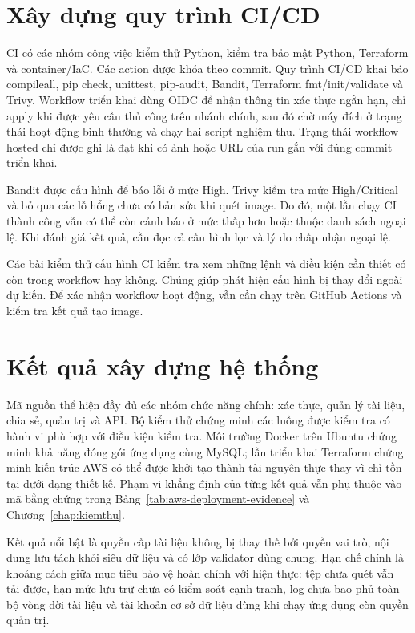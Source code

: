 \section{Xây dựng quy trình CI/CD}
CI có các nhóm công việc kiểm thử Python, kiểm tra bảo mật Python, Terraform và container/IaC. Các action được khóa theo commit. Quy trình CI/CD khai báo compileall, pip check, unittest, pip-audit, Bandit, Terraform fmt/init/validate và Trivy. Workflow triển khai dùng OIDC để nhận thông tin xác thực ngắn hạn, chỉ apply khi được yêu cầu thủ công trên nhánh chính, sau đó chờ máy đích ở trạng thái hoạt động bình thường và chạy hai script nghiệm thu. Trạng thái workflow hosted chỉ được ghi là đạt khi có ảnh hoặc URL của run gắn với đúng commit triển khai.

Bandit được cấu hình để báo lỗi ở mức High. Trivy kiểm tra mức High/Critical và bỏ qua các lỗ hổng chưa có bản sửa khi quét image. Do đó, một lần chạy CI thành công vẫn có thể còn cảnh báo ở mức thấp hơn hoặc thuộc danh sách ngoại lệ. Khi đánh giá kết quả, cần đọc cả cấu hình lọc và lý do chấp nhận ngoại lệ.

Các bài kiểm thử cấu hình CI kiểm tra xem những lệnh và điều kiện cần thiết có còn trong workflow hay không. Chúng giúp phát hiện cấu hình bị thay đổi ngoài dự kiến. Để xác nhận workflow hoạt động, vẫn cần chạy trên GitHub Actions và kiểm tra kết quả tạo image.

\section{Kết quả xây dựng hệ thống}
Mã nguồn thể hiện đầy đủ các nhóm chức năng chính: xác thực, quản lý tài liệu, chia sẻ, quản trị và API. Bộ kiểm thử chứng minh các luồng được kiểm tra có hành vi phù hợp với điều kiện kiểm tra. Môi trường Docker trên Ubuntu chứng minh khả năng đóng gói ứng dụng cùng MySQL; lần triển khai Terraform chứng minh kiến trúc AWS có thể được khởi tạo thành tài nguyên thực thay vì chỉ tồn tại dưới dạng thiết kế. Phạm vi khẳng định của từng kết quả vẫn phụ thuộc vào mã bằng chứng trong Bảng~\ref{tab:aws-deployment-evidence} và Chương~\ref{chap:kiemthu}.

Kết quả nổi bật là quyền cấp tài liệu không bị thay thế bởi quyền vai trò, nội dung lưu tách khỏi siêu dữ liệu và có lớp validator dùng chung. Hạn chế chính là khoảng cách giữa mục tiêu bảo vệ hoàn chỉnh với hiện thực: tệp chưa quét vẫn tải được, hạn mức lưu trữ chưa có kiểm soát cạnh tranh, log chưa bao phủ toàn bộ vòng đời tài liệu và tài khoản cơ sở dữ liệu dùng khi chạy ứng dụng còn quyền quản trị.

